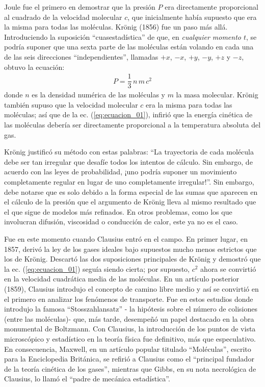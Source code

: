 \par
Joule fue el primero en demostrar que la presión $P$ era directamente proporcional al cuadrado de la velocidad molecular $c$, que inicialmente había supuesto que era la misma para todas las moléculas. Krönig (1856) fue un paso más allá. Introduciendo la suposición \enquote{cuasestadística} de que, en \emph{cualquier momento $t$}, se podría suponer que una sexta parte de las moléculas están volando en cada una de las seis direcciones \enquote{independientes}, llamadas $+x$, $-x$, $+y$, $-y$, $+z$ y $-z$, obtuvo la ecuación:
\begin{align}
P = \dfrac{1}{3} \, n \, m \, c^{2}
\label{eq:ecuacion_01}
\end{align}
donde $n$ es la densidad numérica de las moléculas y $m$ la masa molecular. Krönig también supuso que la velocidad molecular $c$ era la misma para todas las moléculas; así que de la ec. (\ref{eq:ecuacion_01}), infirió que la energía cinética de las moléculas debería ser directamente proporcional a la temperatura absoluta del gas.
\par
Krönig justificó su método con estas palabras: \enquote{La trayectoria de cada molécula debe ser tan irregular que desafíe todos los intentos de cálculo. Sin embargo, de acuerdo con las leyes de probabilidad, ¡uno podría suponer un movimiento completamente regular en lugar de uno completamente irregular!}. Sin embargo, debe notarse que es solo debido a la forma especial de las sumas que aparecen en el cálculo de la presión que el argumento de Krönig lleva al mismo resultado que el que sigue de modelos más refinados. En otros problemas, como los que involucran difusión, viscosidad o conducción de calor, este ya no es el caso.
\par
Fue en este momento cuando Clausius entró en el campo. En primer lugar, en 1857, derivó la ley de los gases ideales bajo supuestos mucho menos estrictos que los de Krönig. Descartó las dos suposiciones principales de Krönig y demostró que la ec. (\ref{eq:ecuacion_01}) seguía siendo cierta; por supuesto, $c^{2}$ ahora se convirtió en la velocidad cuadrática media de las moléculas. En un artículo posterior (1859), Clausius introdujo el concepto de camino libre medio y así se convirtió en el primero en analizar los fenómenos de transporte. Fue en estos estudios donde introdujo la famosa \enquote{Stosszahlansatz} - la hipótesis sobre el número de colisiones (entre las moléculas)- que, más tarde, desempeñó un papel destacado en la obra monumental de Boltzmann. Con Clausius, la introducción de los puntos de vista microscópico y estadístico en la teoría física fue definitivo, más que especulativo. En consecuencia, Maxwell, en un artículo popular titulado \enquote{Moléculas}, escrito para la Enciclopedia Británica, se refirió a Clausius como el \enquote{principal fundador de la teoría cinética de los gases}, mientras que Gibbs, en su nota necrológica de Clausius, lo llamó el \enquote{padre de mecánica estadística}.
